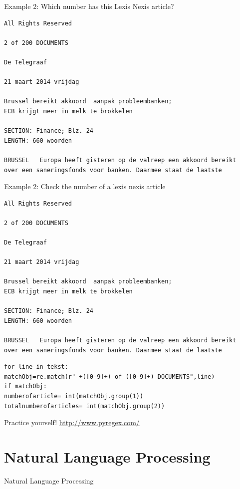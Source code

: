 \documentclass{beamer}
\begin{document}
\begin{frame}[fragile]{Example 2: Which number has this Lexis Nexis article?}
\begin{lstlisting}
All Rights Reserved

2 of 200 DOCUMENTS

De Telegraaf

21 maart 2014 vrijdag

Brussel bereikt akkoord  aanpak probleembanken;
ECB krijgt meer in melk te brokkelen

SECTION: Finance; Blz. 24
LENGTH: 660 woorden

BRUSSEL   Europa heeft gisteren op de valreep een akkoord bereikt 
over een saneringsfonds voor banken. Daarmee staat de laatste
\end{lstlisting}

\end{frame}

\begin{frame}[fragile]{Example 2: Check the number of a lexis nexis article}
\begin{lstlisting}
All Rights Reserved

2 of 200 DOCUMENTS

De Telegraaf

21 maart 2014 vrijdag

Brussel bereikt akkoord  aanpak probleembanken;
ECB krijgt meer in melk te brokkelen

SECTION: Finance; Blz. 24
LENGTH: 660 woorden

BRUSSEL   Europa heeft gisteren op de valreep een akkoord bereikt 
over een saneringsfonds voor banken. Daarmee staat de laatste
\end{lstlisting}

\begin{lstlisting}
for line in tekst:
matchObj=re.match(r" +([0-9]+) of ([0-9]+) DOCUMENTS",line)
if matchObj:
numberofarticle= int(matchObj.group(1))
totalnumberofarticles= int(matchObj.group(2))
\end{lstlisting}
\end{frame}


\begin{frame}{Practice yourself!}
\huge{\url{http://www.pyregex.com/}}
\end{frame}

\section{Natural Language Processing}
\begin{frame}
Natural Language Processing
\end{frame}
\end{document}
